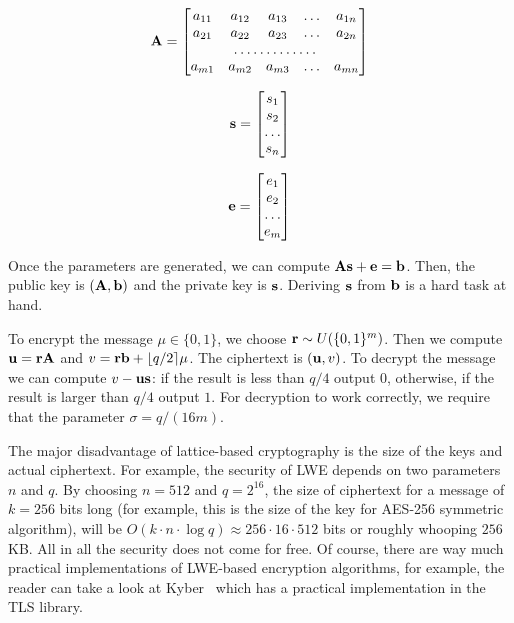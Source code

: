 \begin{equation}
 {\bf A}=\begin{bmatrix}
 a_{11}       & a_{12} & a_{13} & \dots & a_{1n} \\
 a_{21}       & a_{22} & a_{23} & \dots & a_{2n} \\
 \hdotsfor{5} \\
 a_{m1}       & a_{m2} & a_{m3} & \dots & a_{mn}
    \end{bmatrix}
\end{equation}

\begin{equation}
 {\bf s}=\begin{bmatrix}
 s_{1} \\
 s_{2} \\
 \dots \\
 s_{n} 
    \end{bmatrix}
\end{equation}

\begin{equation}
 {\bf e}=\begin{bmatrix}
 e_{1} \\
 e_{2} \\
 \dots \\
 e_{m} 
    \end{bmatrix}
\end{equation}

Once the parameters are generated, we can compute ${\bf As}+{\bf e} = {\bf b}$. Then, the public 
key is $({\bf A, b})$ and the private key is ${\bf s}$. Deriving ${\bf s}$ from ${\bf b}$ is a hard 
task at hand.

To encrypt the message $\mu \in \{0, 1\}$, we choose ${\bf r} \sim U(\{0, 1\}^m)$. Then we compute ${\bf u}={\bf rA}$ and 
$v={\bf rb}+\lfloor q/2 \rceil \mu$. The ciphertext is $({\bf u}, v)$. To decrypt the message we can 
compute $v - \bf{u s}$: if the result is less than $q/4$ output $0$, otherwise, if the result
is larger than $q/4$ output $1$. For decryption to work correctly, we require that the parameter $\sigma = q/(16m)$. 

The major disadvantage of lattice-based cryptography is the size of the keys and actual ciphertext. For example,
the security of LWE depends on two parameters $n$ and $q$. By choosing $n=512$ and $q=2^{16}$, the size of ciphertext
for a message of $k=256$ bits long (for example, this is the size of the key for AES-256 symmetric algorithm), 
will be $O(k \cdot n \cdot \log q) \approx 256 \cdot 16 \cdot 512$ bits or roughly whooping 
$256$ KB. All in all the security does not come for free. Of course, there are way much practical implementations
of LWE-based encryption algorithms, for example, the reader can take a look at Kyber~\cite{nist:kyber} which has a practical 
implementation in the TLS library.

